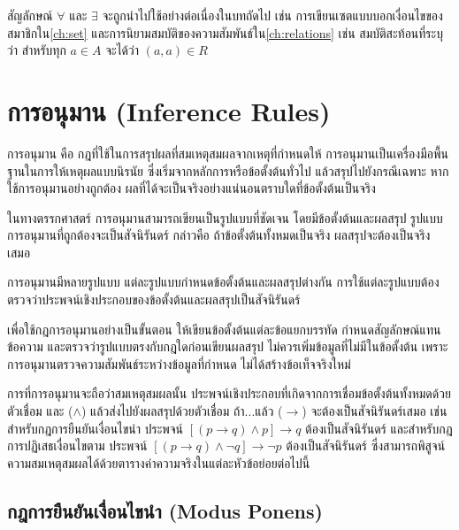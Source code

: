 \begin{rem}
สัญลักษณ์ $\forall$ และ $\exists$ จะถูกนำไปใช้อย่างต่อเนื่องในบทถัดไป เช่น การเขียนเซตแบบบอกเงื่อนไขของสมาชิกใน\autoref{ch:set} และการนิยามสมบัติของความสัมพันธ์ใน\autoref{ch:relations} เช่น สมบัติสะท้อนที่ระบุว่า สำหรับทุก $a \in A$ จะได้ว่า $(a,a) \in R$
\end{rem}

\section{การอนุมาน (Inference Rules)}
\label{sec:inference-rules}

การอนุมาน คือ กฎที่ใช้ในการสรุปผลที่สมเหตุสมผลจากเหตุที่กำหนดให้ การอนุมานเป็นเครื่องมือพื้นฐานในการให้เหตุผลแบบนิรนัย ซึ่งเริ่มจากหลักการหรือข้อตั้งต้นทั่วไป แล้วสรุปไปยังกรณีเฉพาะ หากใช้การอนุมานอย่างถูกต้อง ผลที่ได้จะเป็นจริงอย่างแน่นอนตราบใดที่ข้อตั้งต้นเป็นจริง~\parencite{grimaldi2004discrete}

ในทางตรรกศาสตร์ การอนุมานสามารถเขียนเป็นรูปแบบที่ชัดเจน โดยมีข้อตั้งต้นและผลสรุป รูปแบบการอนุมานที่ถูกต้องจะเป็นสัจนิรันดร์ กล่าวคือ ถ้าข้อตั้งต้นทั้งหมดเป็นจริง ผลสรุปจะต้องเป็นจริงเสมอ

การอนุมานมีหลายรูปแบบ แต่ละรูปแบบกำหนดข้อตั้งต้นและผลสรุปต่างกัน การใช้แต่ละรูปแบบต้องตรวจว่าประพจน์เชิงประกอบของข้อตั้งต้นและผลสรุปเป็นสัจนิรันดร์

เพื่อใช้กฎการอนุมานอย่างเป็นขั้นตอน ให้เขียนข้อตั้งต้นแต่ละข้อแยกบรรทัด กำหนดสัญลักษณ์แทนข้อความ และตรวจว่ารูปแบบตรงกับกฎใดก่อนเขียนผลสรุป ไม่ควรเพิ่มข้อมูลที่ไม่มีในข้อตั้งต้น เพราะการอนุมานตรวจความสัมพันธ์ระหว่างข้อมูลที่กำหนด ไม่ได้สร้างข้อเท็จจริงใหม่

การที่การอนุมานจะถือว่าสมเหตุสมผลนั้น ประพจน์เชิงประกอบที่เกิดจากการเชื่อมข้อตั้งต้นทั้งหมดด้วยตัวเชื่อม และ ($\land$) แล้วส่งไปยังผลสรุปด้วยตัวเชื่อม ถ้า...แล้ว ($\rightarrow$) จะต้องเป็นสัจนิรันดร์เสมอ เช่น สำหรับกฎการยืนยันเงื่อนไขนำ ประพจน์ $[(p \rightarrow q) \land p] \rightarrow q$ ต้องเป็นสัจนิรันดร์ และสำหรับกฎการปฏิเสธเงื่อนไขตาม ประพจน์ $[(p \rightarrow q) \land \neg q] \rightarrow \neg p$ ต้องเป็นสัจนิรันดร์ ซึ่งสามารถพิสูจน์ความสมเหตุสมผลได้ด้วยตารางค่าความจริงในแต่ละหัวข้อย่อยต่อไปนี้

\subsection{กฎการยืนยันเงื่อนไขนำ (Modus Ponens)}

